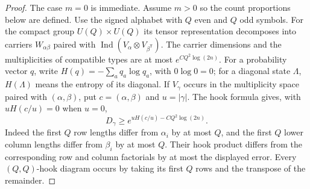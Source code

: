 \begin{proof}
The case $m=0$ is immediate.  Assume $m>0$ so the count
proportions below are defined.  Use the signed alphabet with $Q$ even and $Q$ odd symbols.
For the compact group $U(Q)\times U(Q)$ its tensor representation
decomposes into carriers $W_{\alpha\beta}$ paired with
$\operatorname{Ind}(V_\alpha\otimes V_{\beta^{\mathsf T}})$.
The carrier dimensions and the multiplicities of compatible types
are at most $e^{CQ^2\log(2n)}$.  For a probability vector $q$, write
$H(q)=-\sum_a q_a\log q_a$, with $0\log0=0$; for a diagonal
state $\Lambda$, $H(\Lambda)$ means the entropy of its diagonal.
If $V_\gamma$ occurs in the multiplicity space paired with
$(\alpha,\beta)$, put $c=(\alpha,\beta)$ and $u=|\gamma|$.
The hook formula gives, with $uH(c/u)=0$ when $u=0$,
\begin{equation}\label{rec:coherent-count-dimension}
 D_\gamma\ge e^{uH(c/u)-CQ^2\log(2n)}.
\end{equation}
Indeed the first $Q$ row lengths differ from $\alpha_i$ by at most
$Q$, and the first $Q$ lower column lengths differ from $\beta_i$
by at most $Q$.  Their hook product differs from the corresponding
row and column factorials by at most the displayed error.
Every $(Q,Q)$-hook diagram occurs by taking its first $Q$ rows and
the transpose of the remainder.


\end{proof}
